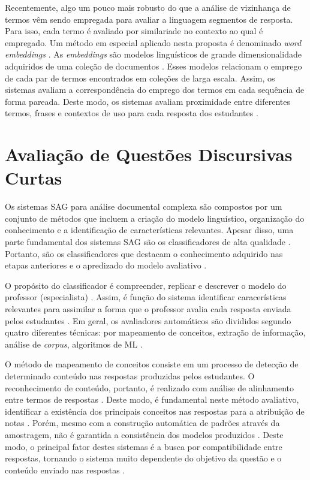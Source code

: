 Recentemente, algo um pouco mais robusto do que a análise de vizinhança de termos vêm sendo empregada para avaliar a linguagem segmentos de resposta. Para isso, cada termo é avaliado por similariade no contexto ao qual é empregado. Um método em especial aplicado nesta proposta é denominado \textit{word embeddings} \cite{sung2019b, ghavidel2020}. As \textit{embeddings} são modelos linguísticos de grande dimensionalidade adquiridos de uma coleção de documentos \cite{goldberg2017}. Esses modelos relacionam o emprego de cada par de termos encontrados em coleções de larga escala. Assim, os sistemas avaliam a correspondência do emprego dos termos em cada sequência de forma pareada. Deste modo, os sistemas avaliam proximidade entre diferentes termos, frases e contextos de uso para cada resposta dos estudantes \cite{riordan2017}.

\section{Avaliação de Questões Discursivas Curtas}

Os sistemas SAG para análise documental complexa são compostos por um conjunto de métodos que incluem a criação do modelo linguístico, organização do conhecimento e a identificação de características relevantes. Apesar disso, uma parte fundamental dos sistemas SAG são os classificadores de alta qualidade \cite{funayama2020}. Portanto, são os classificadores que destacam o conhecimento adquirido nas etapas anteriores e o apredizado do modelo avaliativo \cite{mohler2011}.

O propósito do classificador é compreender, replicar e descrever o modelo do professor (especialista) \cite{yang2021}. Assim, é função do sistema identificar caracerísticas relevantes para assimilar a forma que o professor avalia cada resposta enviada pelos estudantes \cite{jordan2012, mao2018}. Em geral, os avaliadores automáticos são divididos segundo quatro diferentes técnicas: por mapeamento de conceitos, extração de informação, análise de \textit{corpus}, algoritmos de ML \cite{burrows2015}. 

O método de mapeamento de conceitos consiste em um processo de detecção de determinado conteúdo nas respostas produzidas pelos estudantes. O reconhecimento de conteúdo, portanto, é realizado com análise de alinhamento entre termos de respostas \cite{jimenez2013}. Deste modo, é fundamental neste método avaliativo, identificar a existência dos principais conceitos nas respostas para a atribuição de notas \cite{kar2017, chakraborty2017}. Porém, mesmo com a construção automática de padrões através da amostragem, não é garantida a consistência dos modelos produzidos \cite{azad2020}. Deste modo, o principal fator destes sistemas é a busca por compatibilidade entre respostas, tornando o sistema muito dependente do objetivo da questão e o conteúdo enviado nas respostas \cite{filighera2020}.

